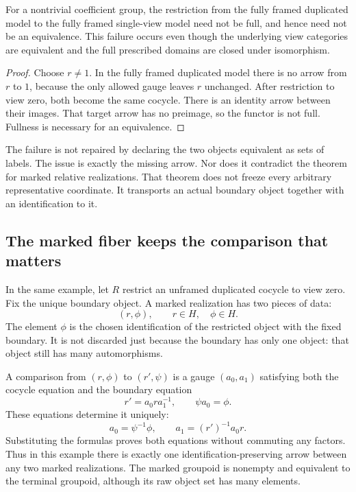 \begin{proposition}\label{KS68}
For a nontrivial coefficient group, the restriction from the fully framed duplicated model to the fully framed single-view model need not be full, and hence need not be an equivalence. This failure occurs even though the underlying view categories are equivalent and the full prescribed domains are closed under isomorphism.
\end{proposition}
\begin{proof}
Choose \(r\ne1\). In the fully framed duplicated model there is no arrow from \(r\) to \(1\), because the only allowed gauge leaves \(r\) unchanged. After restriction to view zero, both become the same cocycle. There is an identity arrow between their images. That target arrow has no preimage, so the functor is not full. Fullness is necessary for an equivalence.
\end{proof}
The failure is not repaired by declaring the two objects equivalent as sets of labels. The issue is exactly the missing arrow. Nor does it contradict the theorem for marked relative realizations. That theorem does not freeze every arbitrary representative coordinate. It transports an actual boundary object together with an identification to it.

\subsection{The marked fiber keeps the comparison that matters}
In the same example, let \(R\) restrict an unframed duplicated cocycle to view zero. Fix the unique boundary object. A marked realization has two pieces of data:
\[
 (r,\phi),\qquad r\in H,\quad\phi\in H.
\]
The element \(\phi\) is the chosen identification of the restricted object with the fixed boundary. It is not discarded just because the boundary has only one object: that object still has many automorphisms.

A comparison from \((r,\phi)\) to \((r',\psi)\) is a gauge \((a_0,a_1)\) satisfying both the cocycle equation and the boundary equation
\[
 r'=a_0ra_1^{-1},\qquad \psi a_0=\phi.
\]
These equations determine it uniquely:
\begin{equation}\label{eq:marked-two-copy}
 a_0=\psi^{-1}\phi,\qquad a_1=(r')^{-1}a_0r.
\end{equation}
Substituting the formulas proves both equations without commuting any factors. Thus in this example there is exactly one identification-preserving arrow between any two marked realizations. The marked groupoid is nonempty and equivalent to the terminal groupoid, although its raw object set has many elements.

